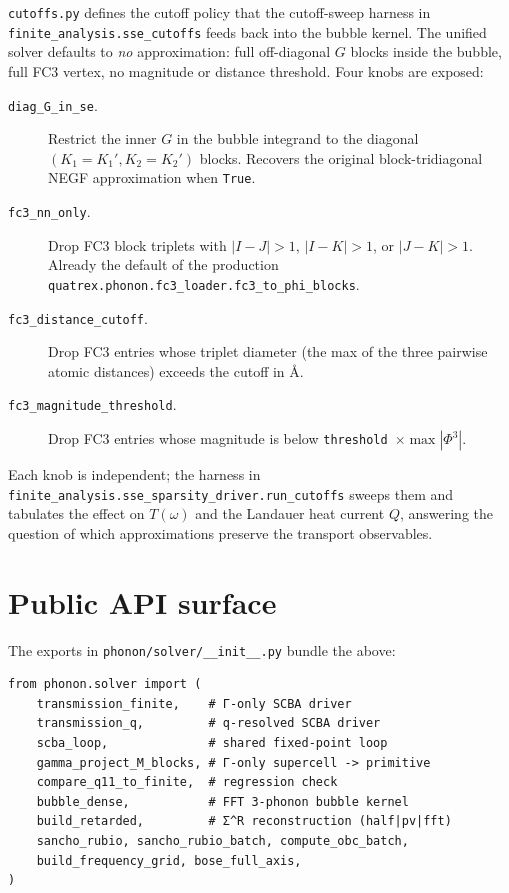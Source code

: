 \texttt{cutoffs.py} defines the cutoff policy that the cutoff-sweep
harness in \texttt{finite\_analysis.sse\_cutoffs} feeds back into the
bubble kernel.  The unified solver defaults to \emph{no} approximation:
full off-diagonal $G$ blocks inside the bubble, full FC3 vertex, no
magnitude or distance threshold.  Four knobs are exposed:

\begin{description}
  \item[\texttt{diag\_G\_in\_se}.]  Restrict the inner $G$ in the bubble
        integrand to the diagonal $(K_1=K_1', K_2=K_2')$ blocks.
        Recovers the original block-tridiagonal NEGF approximation
        when \texttt{True}.
  \item[\texttt{fc3\_nn\_only}.]  Drop FC3 block triplets with
        $|I-J| > 1$, $|I-K| > 1$, or $|J-K| > 1$.  Already the default
        of the production \texttt{quatrex.phonon.fc3\_loader.fc3\_to\_phi\_blocks}.
  \item[\texttt{fc3\_distance\_cutoff}.]  Drop FC3 entries whose
        triplet diameter (the max of the three pairwise atomic
        distances) exceeds the cutoff in \AA{}.
  \item[\texttt{fc3\_magnitude\_threshold}.]  Drop FC3 entries whose
        magnitude is below
        \texttt{threshold}~$\times \max|\Phi^3|$.
\end{description}

Each knob is independent; the harness in
\texttt{finite\_analysis.sse\_sparsity\_driver.run\_cutoffs} sweeps
them and tabulates the effect on $T(\omega)$ and the Landauer heat
current $Q$, answering the question of which approximations preserve
the transport observables.

\section{Public API surface}
\label{sec:solver_api}

The exports in \texttt{phonon/solver/\_\_init\_\_.py} bundle the
above:

\begin{verbatim}
from phonon.solver import (
    transmission_finite,    # Γ-only SCBA driver
    transmission_q,         # q-resolved SCBA driver
    scba_loop,              # shared fixed-point loop
    gamma_project_M_blocks, # Γ-only supercell -> primitive
    compare_q11_to_finite,  # regression check
    bubble_dense,           # FFT 3-phonon bubble kernel
    build_retarded,         # Σ^R reconstruction (half|pv|fft)
    sancho_rubio, sancho_rubio_batch, compute_obc_batch,
    build_frequency_grid, bose_full_axis,
)
\end{verbatim}

